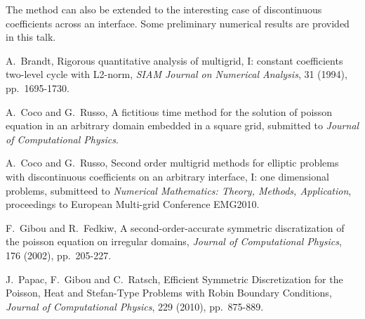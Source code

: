 \documentclass{report}
\begin{document}
The method can also be extended to the interesting case of discontinuous
coefficients across an interface. Some preliminary numerical results are
provided in this talk.

\begin{thebibliography}{100}

A.~Brandt, Rigorous quantitative analysis of multigrid, I: constant
coefficients two-level cycle with L2-norm,
{\em SIAM Journal on Numerical Analysis}, 31 (1994), pp.~1695-1730.

A.~Coco and G.~Russo, A fictitious time method for the solution of
poisson equation in an arbitrary domain embedded in a square grid,
submitted to {\em Journal of Computational Physics}.

A.~Coco and G.~Russo, Second order multigrid methods for elliptic
problems with discontinuous coefficients on an arbitrary interface, I:
one dimensional problems, submitteed to {\em Numerical Mathematics:
Theory, Methods, Application}, proceedings to European Multi-grid
Conference EMG2010.

F.~Gibou and R.~Fedkiw, A second-order-accurate symmetric discratization
of the poisson equation on irregular domains,
{\em Journal of Computational Physics}, 176 (2002), pp.~205-227.

J.~Papac, F.~Gibou and C.~Ratsch, Efficient Symmetric Discretization for
the Poisson, Heat and Stefan-Type Problems with Robin Boundary
Conditions,
{\em Journal of Computational Physics}, 229 (2010), pp.~875-889.


\end{thebibliography}
\end{document}
